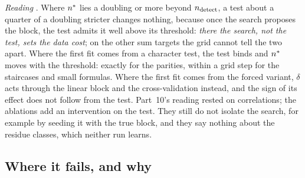 \emph{Reading} . Where $n^{*}$ lies a doubling or more beyond $n_{\rm detect}$, a test about a quarter of a doubling stricter changes nothing, because once the search proposes the block, the test admits it well above its threshold: \emph{there the search, not the test, sets the data cost}; on the other sum targets the grid cannot tell the two apart. Where the first fit comes from a character test, the test binds and $n^{*}$ moves with the threshold: exactly for the parities, within a grid step for the staircases and small formulas. Where the first fit comes from the forced variant, $\delta$ acts through the linear block and the cross-validation instead, and the sign of its effect does not follow from the test. Part~10's reading rested on correlations; the ablations add an intervention on the test. They still do not isolate the search, for example by seeding it with the true block, and they say nothing about the residue classes, which neither run learns.

\subsection{Where it fails, and why}\label{sec:interp-fail}

